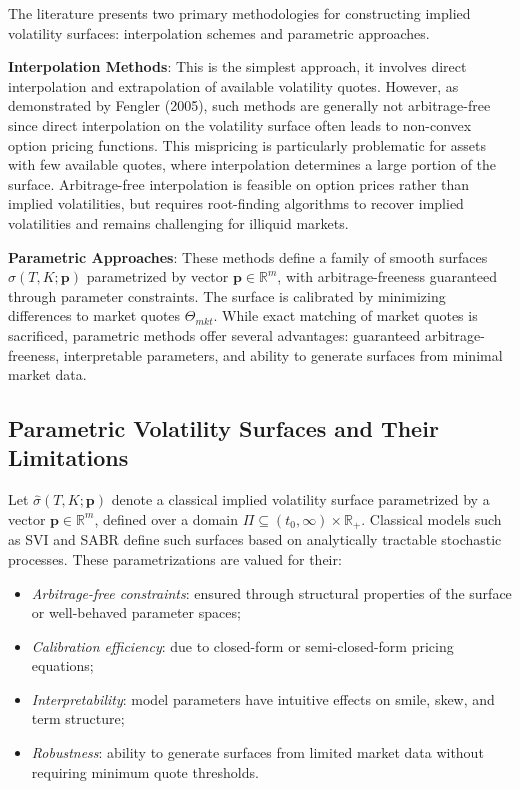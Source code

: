 The literature presents two primary methodologies for constructing implied volatility surfaces: interpolation schemes and parametric approaches.

\textbf{Interpolation Methods}: This is the simplest approach, it involves direct interpolation and extrapolation of available volatility quotes.
However, as demonstrated by Fengler (2005), such methods are generally not arbitrage-free since direct interpolation on the volatility surface often leads to non-convex option pricing functions. This mispricing is particularly problematic for assets with few available quotes, where interpolation determines a large portion of the surface. Arbitrage-free interpolation is feasible on option prices rather than implied volatilities, but requires root-finding algorithms to recover implied volatilities and remains challenging for illiquid markets.

\textbf{Parametric Approaches}: These methods define a family of smooth surfaces $\hat{\sigma}(T,K;\mathbf{p})$ parametrized by vector $\mathbf{p} \in \mathbb{R}^m$, with arbitrage-freeness guaranteed through parameter constraints. The surface is calibrated by minimizing differences to market quotes $\Theta_{mkt}$. While exact matching of market quotes is sacrificed, parametric methods offer several advantages: guaranteed arbitrage-freeness, interpretable parameters, and ability to generate surfaces from minimal market data.

\subsection{Parametric Volatility Surfaces and Their Limitations}

Let $\hat{\sigma}(T, K; \mathbf{p})$ denote a classical implied volatility surface parametrized by a vector $\mathbf{p} \in \mathbb{R}^m$, defined over a domain $\Pi \subseteq (t_0, \infty) \times \mathbb{R}_+$.
Classical models such as SVI and SABR define such surfaces based on analytically tractable stochastic processes.
These parametrizations are valued for their:

\begin{itemize}
    \item \textit{Arbitrage-free constraints}: ensured through structural properties of the surface or well-behaved parameter spaces;
    \item \textit{Calibration efficiency}: due to closed-form or semi-closed-form pricing equations;
    \item \textit{Interpretability}: model parameters have intuitive effects on smile, skew, and term structure;
    \item \textit{Robustness}: ability to generate surfaces from limited market data without requiring minimum quote thresholds.
\end{itemize}

